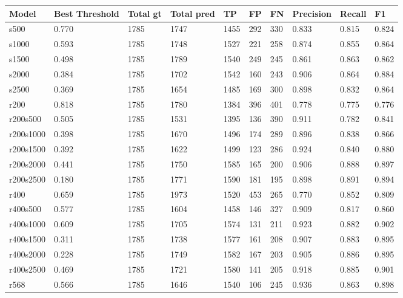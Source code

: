     \begin{table}[ht]
\centering
\begin{tabular}{|p{2cm}|p{1cm}|p{1cm}|p{1cm}|p{1cm}|p{1cm}|p{1cm}|p{1cm}|p{1cm}|p{1cm}|}
\hline
Model & Best Threshold & Total gt & Total pred & TP & FP & FN & Precision & Recall & F1 \\ \hline
s500         & 0.770 & 1785 & 1747 & 1455 & 292 & 330 & 0.833 & 0.815 & 0.824 \\ \hline
s1000        & 0.593 & 1785 & 1748 & 1527 & 221 & 258 & 0.874 & 0.855 & 0.864 \\ \hline
s1500        & 0.498 & 1785 & 1789 & 1540 & 249 & 245 & 0.861 & 0.863 & 0.862 \\ \hline
s2000        & 0.384 & 1785 & 1702 & 1542 & 160 & 243 & 0.906 & 0.864 & 0.884 \\ \hline
s2500        & 0.369 & 1785 & 1654 & 1485 & 169 & 300 & 0.898 & 0.832 & 0.864 \\ \hline
r200         & 0.818 & 1785 & 1780 & 1384 & 396 & 401 & 0.778 & 0.775 & 0.776 \\ \hline
r200s500     & 0.505 & 1785 & 1531 & 1395 & 136 & 390 & 0.911 & 0.782 & 0.841 \\ \hline
r200s1000    & 0.398 & 1785 & 1670 & 1496 & 174 & 289 & 0.896 & 0.838 & 0.866 \\ \hline
r200s1500    & 0.392 & 1785 & 1622 & 1499 & 123 & 286 & 0.924 & 0.840 & 0.880 \\ \hline
r200s2000    & 0.441 & 1785 & 1750 & 1585 & 165 & 200 & 0.906 & 0.888 & 0.897 \\ \hline
r200s2500    & 0.180 & 1785 & 1771 & 1590 & 181 & 195 & 0.898 & 0.891 & 0.894 \\ \hline
r400         & 0.659 & 1785 & 1973 & 1520 & 453 & 265 & 0.770 & 0.852 & 0.809 \\ \hline
r400s500     & 0.577 & 1785 & 1604 & 1458 & 146 & 327 & 0.909 & 0.817 & 0.860 \\ \hline
r400s1000    & 0.609 & 1785 & 1705 & 1574 & 131 & 211 & 0.923 & 0.882 & 0.902 \\ \hline
r400s1500    & 0.311 & 1785 & 1738 & 1577 & 161 & 208 & 0.907 & 0.883 & 0.895 \\ \hline
r400s2000    & 0.228 & 1785 & 1749 & 1582 & 167 & 203 & 0.905 & 0.886 & 0.895 \\ \hline
r400s2500    & 0.469 & 1785 & 1721 & 1580 & 141 & 205 & 0.918 & 0.885 & 0.901 \\ \hline
r568         & 0.566 & 1785 & 1646 & 1540 & 106 & 245 & 0.936 & 0.863 & 0.898 \\ \hline

\end{tabular}
\end{table}
